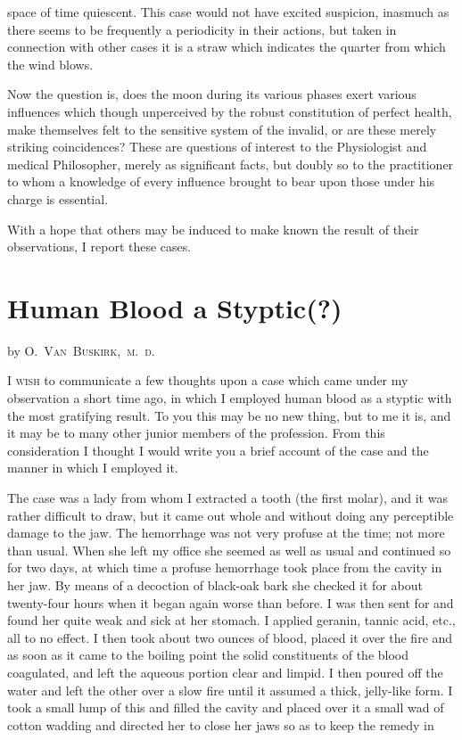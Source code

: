 space of time quiescent. This case would not have excited suspicion,
inasmuch as there seems to be frequently a periodicity in their
actions, but taken in connection with other cases it is a straw which
indicates the quarter from which the wind blows.

Now the question is, does the moon during its various phases exert
various influences which though unperceived by the robust constitution
of perfect health, make themselves felt to the sensitive system
of the invalid, or are these merely striking coincidences? These are
questions of interest to the Physiologist and medical Philosopher,
merely as significant facts, but doubly so to the practitioner to whom
a knowledge of every influence brought to bear upon those under his
charge is essential.

With a hope that others may be induced to make known the result
of their observations, I report these cases.

\section*{Human Blood a Styptic(?)}

by \textsc{O.~Van~Buskirk,\ m.~d.}

\lettrine[lines=1]{}{I wish} to communicate a few thoughts upon a case which came under
my observation a short time ago, in which I employed human blood as
a styptic with the most gratifying result. To you this may be no new
thing, but to me it is, and it may be to many other junior members of
the profession. From this consideration I thought I would write you
a brief account of the case and the manner in which I employed it.

The case was a lady from whom I extracted a tooth (the first molar),
and it was rather difficult to draw, but it came out whole and without
doing any perceptible damage to the jaw. The hemorrhage was not
very profuse at the time; not more than usual. When she left my office
she seemed as well as usual and continued so for two days, at which
time a profuse hemorrhage took place from the cavity in her jaw. By
means of a decoction of black-oak bark she checked it for about twenty-four
hours when it began again worse than before. I was then sent for
and found her quite weak and sick at her stomach. I applied geranin,
tannic acid, etc., all to no effect. I then took about two ounces of blood,
placed it over the fire and as soon as it came to the boiling point the
solid constituents of the blood coagulated, and left the aqueous portion
clear and limpid. I then poured off the water and left the other over
a slow fire until it assumed a thick, jelly-like form. I took a small lump
of this and filled the cavity and placed over it a small wad of cotton
wadding and directed her to close her jaws so as to keep the remedy in\endinput
